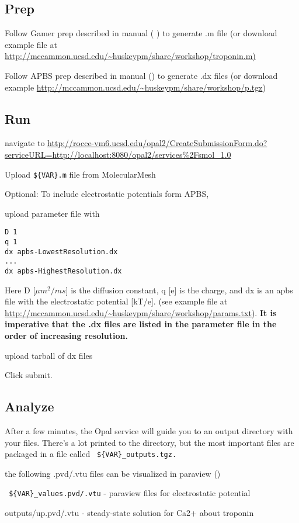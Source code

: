 \documentclass{article}
\begin{document}
\subsection{Prep}
\lbi
\item Follow Gamer prep described in manual ( ) to generate .m file (or download example file at 
\url{http://mccammon.ucsd.edu/~huskeypm/share/workshop/troponin.m) }
\item Follow APBS prep described in manual () to generate .dx files (or download example \url{http://mccammon.ucsd.edu/~huskeypm/share/workshop/p.tgz})
\lei

\subsection{Run}
\label{opal}
\lbi
\item navigate to 
\url{http://rocce-vm6.ucsd.edu/opal2/CreateSubmissionForm.do?serviceURL=http://localhost:8080/opal2/services%2Fsmol_1.0}
\item Upload \verb!${VAR}.m! file from MolecularMesh

\item Optional: To include electrostatic potentials form APBS, 
  \lbn
  \item upload parameter file with
\begin{verbatim}
D 1
q 1
dx apbs-LowestResolution.dx
...             
dx apbs-HighestResolution.dx
\end{verbatim}
Here D [$\mu m^2/ms$] is the diffusion constant, q [e] is the charge, and dx is an apbs file with the electrostatic potential [kT/e]. (see example file at \url{http://mccammon.ucsd.edu/~huskeypm/share/workshop/params.txt}). \textbf{It is imperative that the .dx files are listed in the parameter file in the order of increasing resolution.}  

  \item upload tarball of dx files 
  \len

\item Click submit. 
\lei

\subsection{Analyze}
\lbi
\item After a few minutes, the Opal service will guide you to an output directory with your files. There's a lot printed to the directory, but the most important files are packaged in a file called \verb! ${VAR}_outputs.tgz.!
\item the following .pvd/.vtu files can be visualized in paraview ()
  \lbi
  \item \verb! ${VAR}_values.pvd/.vtu! - paraview files for electrostatic potential
  \item outputs/up.pvd/.vtu - steady-state solution for Ca2+ about troponin
  \lei
\lei
\end{document}
